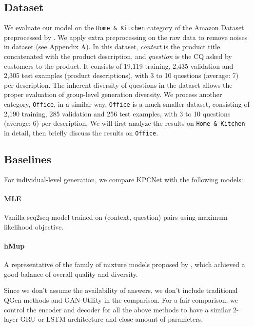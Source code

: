 \subsection{Dataset}
We evaluate our model on the \texttt{Home \& Kitchen} category of the Amazon Dataset \citep{mcauley2015image,mcauley2016addressing} preprocessed by \citet{rao2019answer}. We apply extra preprocessing on the raw data to remove noises in dataset (see Appendix A). In this dataset, \textit{context} is the product title concatenated with the product description, and \textit{question} is the CQ asked by customers to the product. It consists of 19,119 training, 2,435 validation and 2,305 test examples (product descriptions), with 3 to 10 questions (average: 7) per description. The inherent diversity of questions in the dataset allows the proper evaluation of group-level generation diversity. We process another category, \texttt{Office}, in a similar way. \texttt{Office} is a much smaller dataset, consisting of 2,190 training, 285 validation and 256 test examples, with 3 to 10 questions (average: 6) per description. We will first analyze the results on \texttt{Home \& Kitchen} in detail, then briefly discuss the results on \texttt{Office}.

\subsection{Baselines}

For individual-level generation, we compare KPCNet with the following models: 
\paragraph{MLE} Vanilla seq2seq model trained on (context, question) pairs using maximum likelihood objective.  
\paragraph{hMup} A representative of the family of mixture models proposed 
by \citet{shen2019mixture}, which achieved a good balance of 
overall quality and diversity. 

Since we don't assume the availability of answers, we don't include traditional QGen methods and GAN-Utility \citep{rao2019answer} in the comparison.
For a fair comparison, we control the encoder and decoder for all the above methods to have a similar 2-layer GRU \citep{cho2014learning} or LSTM \citep{hochreiter1997long} architecture and close amount of parameters. 

